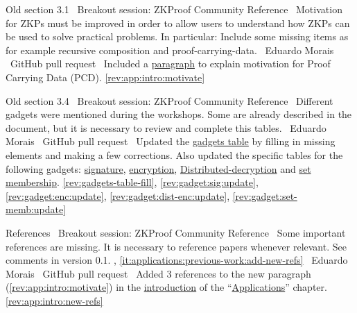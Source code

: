 Old section 3.1
\newcol \ccontext\ Breakout session: ZKProof Community Reference
				\propContrib\ Motivation for ZKPs must be improved in order to allow users to understand how ZKPs can be used to solve practical problems. In particular: Include some missing items as for example recursive composition and proof-carrying-data.
\newcol {}
\newcol \contributors\ Eduardo Morais
				\submit\ GitHub pull request
				\Chan\ Included a \hyperref[par:apps:intro:functionality-vs-performance]{paragraph} to explain motivation for Proof Carrying Data (PCD).	
\newcol \ref{rev:app:intro:motivate}
\rowendL
\myendIssue



Old section 3.4
\newcol \ccontext\ Breakout session: ZKProof Community Reference
				\propContrib\ Different gadgets were mentioned during the workshops. Some are already described in the document, but it is necessary to review and complete this tables.
\newcol {}
\newcol \contributors\ Eduardo Morais
				\submit\ GitHub pull request
				\Chan\ Updated the \hyperref[tab:list-gadgets]{gadgets table} by filling in missing elements and making a few corrections.
				Also updated the specific tables for the following gadgets: \hyperref[tab:gadget-signature]{signature}, \hyperref[tab:gadget-encryption]{encryption}, \hyperref[tab:gadget-dist-decryption]{Distributed-decryption} and \hyperref[tab:gadget-set-membership]{set membership}.
\newcol \ref{rev:gadgets-table-fill}, \ref{rev:gadget:sig:update}, \ref{rev:gadget:enc:update}, \ref{rev:gadget:dist-enc:update}, \ref{rev:gadget:set-memb:update}
\rowendL
\myendIssue


References
\newcol \ccontext\ Breakout session: ZKProof Community Reference
				\propContrib\ Some important references are missing. It is necessary to reference papers whenever relevant. See comments in version 0.1.
\newcol {}, \ref{it:applications:previous-work:add-new-refs}
\newcol \contributors\ Eduardo Morais
				\submit\ GitHub pull request
				\Chan\ Added 3 references to the new paragraph (\ref{rev:app:intro:motivate}) in the \hyperref[apps:intro]{introduction} of the ``\hyperref[chap:apps]{Applications}'' chapter.
\newcol \ref{rev:app:intro:new-refs}
\rowendL
\myendIssue
